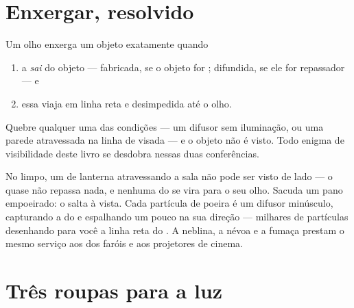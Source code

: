 \section{Enxergar, resolvido}

\begin{proposition}\label{prop:g7:light-sources-propagation:vision}
Um olho enxerga um objeto exatamente quando
\begin{enumerate}
  \item a  \emph{sai} do objeto --- fabricada, se o objeto for
        ; difundida, se ele for repassador --- e
  \item essa  viaja em linha reta e desimpedida até o olho.
\end{enumerate}
Quebre qualquer uma das condições --- um difusor sem iluminação, ou
uma parede atravessada na linha de visada --- e o objeto não é visto.
Todo enigma de visibilidade deste livro se desdobra nessas duas
conferências.
\end{proposition}

\begin{example}\label{ex:g7:light-sources-propagation:beam}
No  limpo, um  de lanterna atravessando a sala não pode ser
visto de lado --- o  quase não repassa nada, e nenhuma  do 
se vira para o seu olho. Sacuda um pano empoeirado: o  salta à
vista. Cada partícula de poeira é um difusor minúsculo, capturando a
 do  e espalhando um pouco na sua direção --- milhares de
partículas desenhando para você a linha reta do . A neblina, a
névoa e a fumaça prestam o mesmo serviço aos  dos faróis e aos
projetores de cinema.
\end{example}

\section{Três roupas para a luz}

